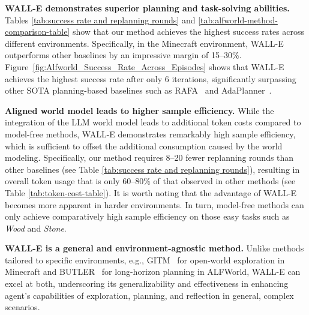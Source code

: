 \documentclass{article} %
\begin{document}
\textbf{WALL-E demonstrates superior planning and task-solving abilities.} 
Tables \ref{tab:success rate and replanning rounds} and \ref{tab:alfworld-method-comparison-table} show that our method achieves the highest success rates across different environments. Specifically, in the Minecraft environment, WALL-E outperforms other baselines by an impressive margin of 15–30\%.
Figure~\ref{fig:Alfworld_Success_Rate_Across_Episodes} shows that WALL-E achieves the highest success rate after only 6 iterations, significantly surpassing other SOTA planning-based baselines such as RAFA~\citep{hao2023reasoning} and AdaPlanner~\citep{sun2024adaplanner}. 

\textbf{Aligned world model leads to higher sample efficiency.} While the integration of the LLM world model leads to additional token costs compared to model-free methods, WALL-E demonstrates remarkably high sample efficiency, which is sufficient to offset the additional consumption caused by the world modeling. 
Specifically, our method requires 8–20 fewer replanning rounds than other baselines (see Table \ref{tab:success rate and replanning rounds}), resulting in overall token usage that is only 60–80\% of that observed in other methods (see Table \ref{tab:token-cost-table}).
It is worth noting that the advantage of WALL-E becomes more apparent in harder environments. In turn, model-free methods can only achieve comparatively high sample efficiency on those easy tasks such as \textit{Wood} and \textit{Stone}.




\textbf{WALL-E is a general and environment-agnostic method.}
Unlike methods tailored to specific environments, e.g., GITM~\citep{zhu2023ghost} for open-world exploration in Minecraft and BUTLER~\citep{micheli2021language} for long-horizon planning in ALFWorld, WALL-E can excel at both, underscoring its generalizability and effectiveness in enhancing agent's capabilities of exploration, planning, and reflection in general, complex scenarios.
\end{document}
